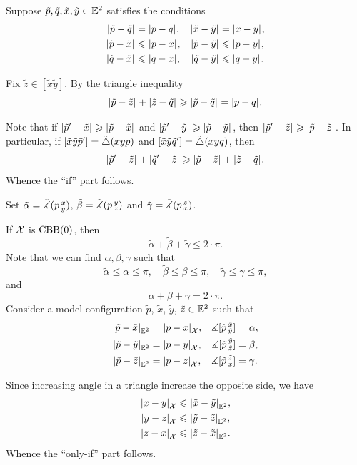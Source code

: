 Suppose $\tilde p,\tilde q,\tilde x,\tilde y\in\mathbb{E}^2$ satisfies the conditions 
\begin{align*}
\dist{\tilde p}{\tilde q}{}&=\dist{p}{q}{},
&
\dist{\tilde x}{\tilde y}{}&=\dist{x}{y}{},
\\
\dist{\tilde p}{\tilde x}{}&\le \dist{p}{x}{},
&
\dist{\tilde p}{\tilde y}{}&\le \dist{p}{y}{},
\\
\dist{\tilde q}{\tilde x}{}&\le \dist{q}{x}{},
&
\dist{\tilde q}{\tilde y}{}&\le \dist{q}{y}{}.
\end{align*}

Fix $\tilde z\in [\tilde x\tilde y]$.
By the triangle inequality 
\[\dist{\tilde p}{\tilde z}{}+\dist{\tilde z}{\tilde q}{}\ge \dist{\tilde p}{\tilde q}{}=\dist{p}{q}{}.\]

Note that if 
$\dist{\tilde p'}{\tilde x}{}\ge \dist{\tilde p}{\tilde x}{}$
and
$\dist{\tilde p'}{\tilde y}{}\ge \dist{\tilde p}{\tilde y}{}$,
then $\dist{\tilde p'}{\tilde z}{}\ge \dist{\tilde p}{\tilde z}{}$.
In particular, if $[\tilde x\tilde y\tilde p']=\tilde\triangle(xyp)$ and $[\tilde x\tilde y\tilde q']=\tilde\triangle(xyq)$, then
\begin{align*}
 \dist{\tilde p'}{\tilde z}{}+\dist{\tilde q'}{\tilde z}{}\ge \dist{\tilde p}{\tilde z}{}+\dist{\tilde z}{\tilde q}{}.
\end{align*}
Whence the ``if'' part follows.

Set $\tilde\alpha=\tilde\measuredangle(p\,{}^{x}_{y})$, $\tilde\beta=\tilde\measuredangle(p\,{}^{y}_{z})$ and $\tilde\gamma=\tilde\measuredangle(p\,{}^{z}_{x})$.

If $\mathcal{X}$ is $\mathrm{CBB}(0)$, then
\[\tilde\alpha+\tilde\beta+\tilde\gamma\le 2\cdot \pi.\]
Note that we can find $\alpha,\beta,\gamma$ such that 
\[
\tilde\alpha\le\alpha\le\pi,
\quad \tilde\beta\le\beta\le\pi,
\quad\tilde\gamma\le\gamma\le\pi,\]
and
\[\alpha+\beta+\gamma=2\cdot \pi.\]
Consider a model configuration $\tilde p$, $\tilde x$, $\tilde y$, $\tilde z\in\mathbb{E}^2$ such that 
\begin{align*}
\dist{\tilde p}{\tilde x}{\EE^2}&=\dist{p}{x}{\spc{X}},
&
\mangle\hinge {\tilde p}{\tilde x}{\tilde y}&=\alpha,
\\
\dist{\tilde p}{\tilde y}{\EE^2}&=\dist{p}{y}{\spc{X}},
&
\mangle\hinge {\tilde p}{\tilde y}{\tilde z}&=\beta,
\\
\dist{\tilde p}{\tilde z}{\EE^2}&=\dist{p}{z}{\spc{X}},
&
\mangle\hinge {\tilde p}{\tilde z}{\tilde x}&=\gamma.
\end{align*}

Since increasing angle in a triangle increase the opposite side, we have 
\begin{align*}
\dist{x}{y}{\spc{X}}&\le\dist{\tilde x}{\tilde y}{\EE^2},
\\
\dist{y}{z}{\spc{X}}&\le\dist{\tilde y}{\tilde z}{\EE^2},
\\
\dist{z}{x}{\spc{X}}&\le\dist{\tilde z}{\tilde x}{\EE^2}.
\end{align*}
Whence the ``only-if'' part follows.

